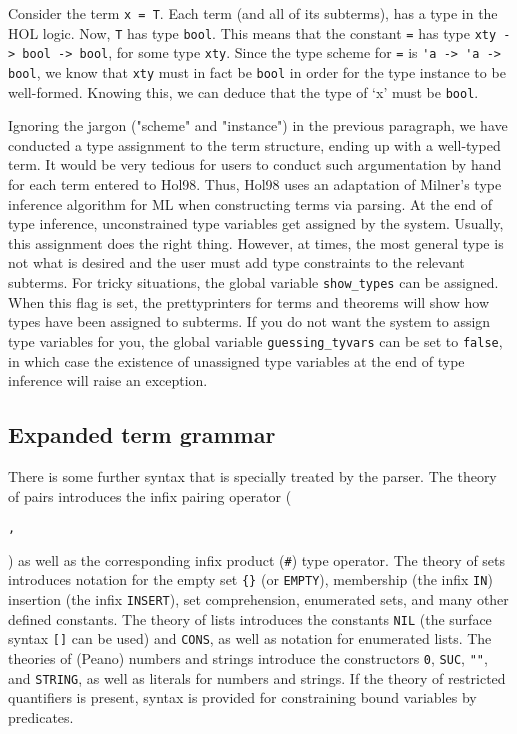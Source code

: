 \documentclass[12pt,fleqn,a4paper]{report}
\begin{document}
Consider the term \verb+x = T+.
Each term (and all of its subterms), has a type in the HOL
logic. Now, \verb+T+ has type \verb+bool+. This means that the constant
\verb+=+ has type \verb+xty -> bool -> bool+, for some type
\verb+xty+. Since the type scheme for \verb+=+ is
\verb+'a -> 'a -> bool+, we know that \verb+xty+ must in fact be
\verb+bool+ in order for the type instance to be well-formed. Knowing
this, we can deduce that the type of `x' must be \verb+bool+.

   Ignoring the jargon ("scheme" and "instance") in the previous
paragraph, we have conducted a type assignment to the term structure,
ending up with a well-typed term. It would be very tedious for users to
conduct such argumentation by hand for each term entered to Hol98. Thus,
Hol98 uses an adaptation of Milner's type inference algorithm for ML
when constructing terms via parsing. At the end of type inference,
unconstrained type variables get assigned by the system. Usually, this
assignment does the right thing. However, at times, the most general
type is not what is desired and the user must add type constraints to
the relevant subterms. For tricky situations, the global variable
\verb+show_types+ can be assigned. When this flag is set, the prettyprinters
for terms and theorems will show how types have been assigned to
subterms. If you do not want the system to assign type variables for
you, the global variable \verb+guessing_tyvars+ can be set to
\verb+false+, in which case the existence of unassigned type variables
at the end of type inference will raise an exception.

\subsection{Expanded term grammar}

There is some further syntax that is specially treated by the
 parser. The theory of pairs introduces the infix pairing operator
 (\begin{Large}\verb+,+\end{Large}) as well as the corresponding infix
 product (\verb+#+) type operator. The theory of sets introduces
 notation for the empty set \verb+{}+ (or \verb+EMPTY+), membership (the
 infix \verb+IN+) insertion (the infix \verb+INSERT+), set
 comprehension, enumerated sets, and many other defined constants. The
 theory of lists introduces the constants \verb+NIL+ (the surface syntax
 \verb+[]+ can be used) and \verb+CONS+, as well as notation for
 enumerated lists. The theories of (Peano) numbers and strings introduce
 the constructors \verb+0+, \verb+SUC+, \verb+""+, and \verb+STRING+, as
 well as literals for numbers and strings. If the theory of restricted
 quantifiers is present, syntax is provided for constraining bound
 variables by predicates.
\end{document}
